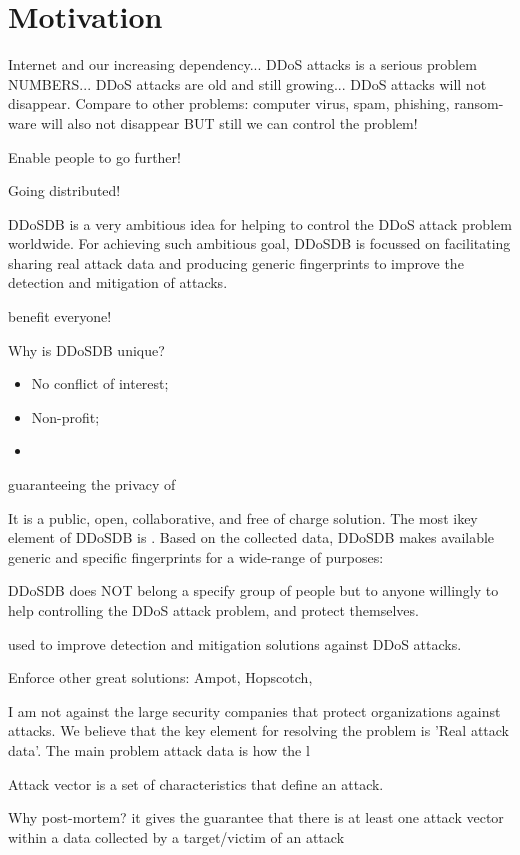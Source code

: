\section{Motivation}


Internet and our increasing dependency...
DDoS attacks is a serious problem NUMBERS...
DDoS attacks are old and still growing...
DDoS attacks will not disappear. Compare to other problems: computer virus, spam, phishing, ransom-ware will also not disappear BUT still we can control the problem!

Enable people to go further!

Going distributed!
  
DDoSDB is a very ambitious idea for helping to control the DDoS attack problem worldwide. For achieving such ambitious goal, DDoSDB is focussed on facilitating sharing real attack data and producing generic fingerprints to improve the detection and mitigation of attacks.

benefit everyone! 

Why is DDoSDB unique? 
\begin{itemize}
	\item No conflict of interest;
	\item Non-profit; 
	\item 
\end{itemize}



guaranteeing the privacy of 

It is a public, open, collaborative, and free of charge solution. The most ikey element of DDoSDB is . Based on the collected data, DDoSDB makes available generic and specific fingerprints for a wide-range of purposes:

DDoSDB does NOT belong a specify group of people but to anyone willingly to help controlling the DDoS attack problem, and protect themselves. 

used to improve detection and mitigation solutions against DDoS attacks.

Enforce other great solutions: Ampot, Hopscotch, 

I am not against the large security companies that protect organizations against attacks. We believe that the key element for resolving the problem is 'Real attack data'. The main problem 
attack data is how the l 

Attack vector is a set of characteristics that define an attack. 

Why post-mortem? it gives the guarantee that there is at least one attack vector within a data collected by a target/victim of an attack 


